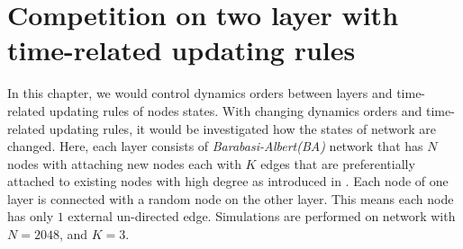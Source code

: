 
\chapter{Competition on two layer with time-related updating rules}
\label{chap:competition on two layer with time-related updating rules}
In this chapter, we would control dynamics orders between layers and time-related updating rules of nodes states. With changing dynamics orders and time-related updating rules, it would be investigated how the states of network are changed.
Here, each layer consists of \textit{Barabasi-Albert(BA)} network that has $N$ nodes with attaching new nodes each with $K$ edges that are preferentially attached to existing nodes with high degree as introduced in \parencite{barabasi1999}. Each node of one layer is connected with a random node on the other layer. This means each node has only $1$ external un-directed edge. Simulations are performed on network with $N=2048$, and $K=3$.

